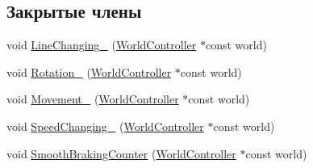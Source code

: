 \subsection*{Закрытые члены}
\begin{DoxyCompactItemize}
\item 
void \hyperlink{classrtm_1_1_vehicle_object_afbfb4168caaa0b61ff8cc18e0b52275c}{Line\+Changing\+\_\+} (\hyperlink{classrtm_1_1_world_controller}{World\+Controller} $\ast$const world)
\item 
void \hyperlink{classrtm_1_1_vehicle_object_a6961d03a7e8a805a9bd4422a8d0c1985}{Rotation\+\_\+} (\hyperlink{classrtm_1_1_world_controller}{World\+Controller} $\ast$const world)
\item 
void \hyperlink{classrtm_1_1_vehicle_object_a0db960e75dbcb12d028b239e441ea0ed}{Movement\+\_\+} (\hyperlink{classrtm_1_1_world_controller}{World\+Controller} $\ast$const world)
\item 
void \hyperlink{classrtm_1_1_vehicle_object_aee8f792a78b9b1becf7a84c01157520b}{Speed\+Changing\+\_\+} (\hyperlink{classrtm_1_1_world_controller}{World\+Controller} $\ast$const world)
\item 
void \hyperlink{classrtm_1_1_vehicle_object_a76d76e5138ecb2188bb678a361ca58d7}{Smooth\+Braking\+Counter} (\hyperlink{classrtm_1_1_world_controller}{World\+Controller} $\ast$const world)
\end{DoxyCompactItemize}
